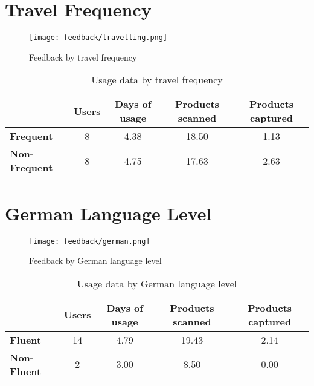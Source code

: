 \section{Travel Frequency}

    \begin{figure}[H]
      \centering
      \texttt{[image: feedback/travelling.png]}
      \caption{Feedback by travel frequency}
      \label{fig:feedback-travelling}
      \end{figure}
      
    \begin{table}[H]
        \begin{tabular}{l|c|c|c|c|}
        \cline{2-5}
            & Users & Days of usage & Products scanned & Products captured \\ \hline
            \multicolumn{1}{|l|}{\textbf{Frequent}}     & 8          & 4.38          & 18.50            & 1.13              \\ \hline
            \multicolumn{1}{|l|}{\textbf{Non-Frequent}} & 8           & 4.75          & 17.63            & 2.63              \\ \hline
        \end{tabular}
        \caption{Usage data by travel frequency}
        \label{tab:usage-travelling}
    \end{table}

\section{German Language Level}

    \begin{figure}[H]
      \centering
      \texttt{[image: feedback/german.png]}
      \caption{Feedback by German language level}
      \label{fig:feedback-german}
      \end{figure}
      
    \begin{table}[H]
        \begin{tabular}{l|c|c|c|c|}
        \cline{2-5}
            & Users & Days of usage & Products scanned & Products captured \\ \hline
            \multicolumn{1}{|l|}{\textbf{Fluent}}     & 14          & 4.79          & 19.43            & 2.14              \\ \hline
            \multicolumn{1}{|l|}{\textbf{Non-Fluent}} & 2           & 3.00          & 8.50            & 0.00              \\ \hline
        \end{tabular}
        \caption{Usage data by German language level}
        \label{tab:usage-german}
    \end{table}

